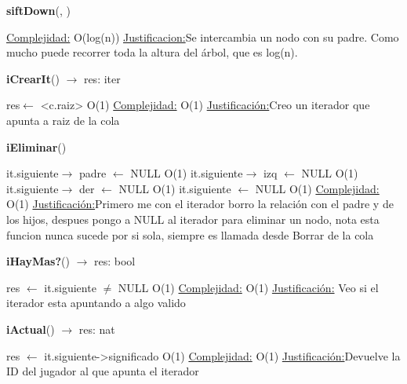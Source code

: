\begin{Representacion}
\begin{Algoritmos}
\begin{algorithm}[H]{\textbf{siftDown}(, )}
\begin{algorithmic}[1]
		\medskip
		\Statex \underline{Complejidad:} O(log(n))
			\Statex \underline{Justificacion:}Se intercambia un nodo con su padre. Como mucho puede recorrer toda la altura del árbol, que es log(n).
	\end{algorithmic}
\end{algorithm}


\begin{algorithm}[H]{\textbf{iCrearIt}() $\to$ res: iter}
	\begin{algorithmic}[1]
		\State res$\gets$ <c.raiz> \Comment O(1)
		\medskip
		\Statex \underline{Complejidad:} O(1)
			\Statex \underline{Justificación:}Creo un iterador que apunta a raiz de la cola
	\end{algorithmic}
\end{algorithm}

\begin{algorithm}[H]{\textbf{iEliminar}()}
	\begin{algorithmic}[1]
		\State it.siguiente$\to$ padre $\gets$ NULL \Comment O(1)		
		\State it.siguiente$\to$ izq $\gets$ NULL \Comment O(1)		
		\State it.siguiente$\to$ der $\gets$ NULL \Comment O(1)		
		\State it.siguiente $\gets$ NULL \Comment O(1)		
		\medskip
		\Statex \underline{Complejidad:} O(1)
			\Statex \underline{Justificación:}Primero me con el iterador borro la relación con el padre y de los hijos, despues pongo a NULL al iterador para eliminar un nodo, nota esta funcion nunca sucede por si sola, siempre es llamada desde Borrar de la cola
	\end{algorithmic}
\end{algorithm}

\begin{algorithm}[H]{\textbf{iHayMas?}() $\to$ res: bool}
	\begin{algorithmic}[1]
		\State res $\gets$ it.siguiente $\neq$ NULL \Comment O(1)
		\medskip
		\Statex \underline{Complejidad:} O(1)
			\Statex \underline{Justificación:} Veo si el iterador esta apuntando a algo valido
	\end{algorithmic}
\end{algorithm}

\begin{algorithm}[H]{\textbf{iActual}() $\to$ res: nat}
	\begin{algorithmic}[1]
		\State res $\gets$ it.siguiente->significado \Comment O(1)		
		\medskip
		\Statex \underline{Complejidad:} O(1)
			\Statex \underline{Justificación:}Devuelve la ID del jugador al que apunta el iterador
	\end{algorithmic}
\end{algorithm}


\end{Algoritmos}

\end{Representacion}
